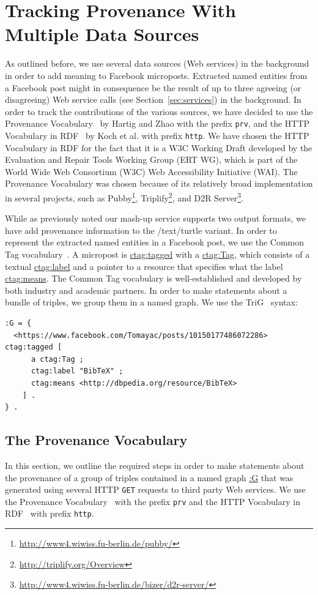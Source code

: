 \documentclass[conference]{IEEEtran}
\begin{document}
\section{Tracking Provenance With Multiple Data Sources}                    \label{sec:tracking}
As outlined before, we use several data sources (Web services) in the background in order to add meaning to Facebook microposts. Extracted named entities from a Facebook post might in consequence be the result of up to three agreeing (or disagreeing) Web service calls (see Section~\ref{sec:services}) in the background. In order to track the contributions of the various sources, we have decided to use the Provenance Vocabulary~\cite{Hartig:Provenance} by Hartig and Zhao with the prefix \texttt{prv}, and the HTTP Vocabulary in RDF~\cite{HTTP:RDF} by Koch et al. with prefix \texttt{http}. We have chosen the HTTP Vocabulary in RDF for the fact that it is a W3C Working Draft  developed by the Evaluation and Repair Tools Working Group (ERT WG), which is part of the World Wide Web Consortium (W3C) Web Accessibility Initiative (WAI). The Provenance Vocabulary was chosen because of its relatively broad implementation in several projects, such as Pubby\footnote{\url{http://www4.wiwiss.fu-berlin.de/pubby/}}, Triplify\footnote{\url{http://triplify.org/Overview}}, and D2R Server\footnote{\url{http://www4.wiwiss.fu-berlin.de/bizer/d2r-server/}}.

While as previously noted our mash-up service supports two output formats, we have add provenance information to the /text/turtle variant. In order to represent the extracted named entities in a Facebook post, we use the Common Tag vocabulary~\cite{CommonTag:Spec}. A micropost is \url{ctag:tagged} with a \url{ctag:Tag}, which consists of a textual \url{ctag:label} and a pointer to a resource that specifies what the label \url{ctag:means}. The Common Tag vocabulary is well-established and developed by both industry and academic partners. In order to make statements about a bundle of triples, we group them in a named graph. We use the
TriG~\cite{Bizer:TriG} syntax:
\begin{lstlisting}
:G = {
  <https://www.facebook.com/Tomayac/posts/10150177486072286> ctag:tagged [
      a ctag:Tag ;
      ctag:label "BibTeX" ;
      ctag:means <http://dbpedia.org/resource/BibTeX>
    ] .
} .
\end{lstlisting}

\subsection{The Provenance Vocabulary}                                      \label{sec:provenance}
In this section, we outline the required steps in order to make statements about the provenance of a group of triples
contained in a named graph \url{:G} that was generated using several HTTP \texttt{GET} requests to third party Web
services. We use the Provenance Vocabulary~\cite{Hartig:Provenance} with the prefix \texttt{prv} and the HTTP Vocabulary in RDF~\cite{HTTP:RDF} with prefix \texttt{http}.
\end{document}

